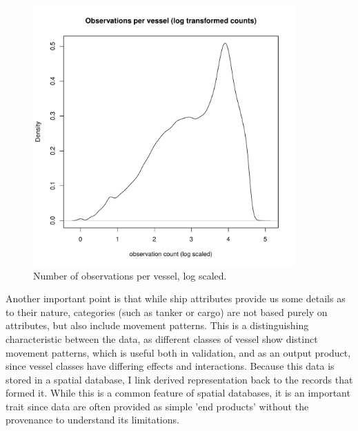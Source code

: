 \documentclass[12pt,letterpaper]{article}
\begin{document}
\begin{figure}[htbp]
  \centering
  \includegraphics[width=100mm]{figures/obs-per-vessel-log.pdf}
  \caption{Number of observations per vessel, log scaled.}
  \label{fig:obs-per-vessel-log}
\end{figure}




Another important point is that while ship attributes provide us some details as to their nature, categories (such as tanker or cargo) are not based purely on attributes, but also include movement patterns. This is a distinguishing characteristic between the data, as different classes of vessel show distinct movement patterns, which is useful both in validation, and as an output product, since vessel classes have differing effects and interactions. Because this data is stored in a spatial database, I link derived representation %
back to the records that formed it. While this is a common feature of spatial databases, it is an important trait since data are often provided as simple 'end products' without the provenance to understand its limitations.
\end{document}
